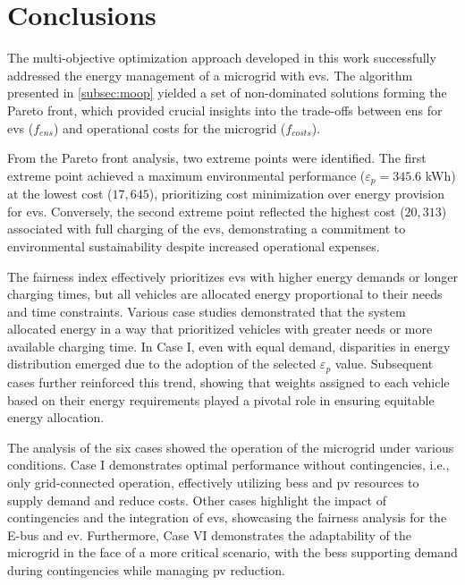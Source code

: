 \documentclass[preprint, 12pt, 3p]{elsarticle}
\begin{document}
\glsresetall

\section{Conclusions}\label{sec:conclusions}

The multi-objective optimization approach developed in this work successfully addressed the energy management of a microgrid with \glspl{ev}. The algorithm presented in \ref{subsec:moop} yielded a set of non-dominated solutions forming the Pareto front, which provided crucial insights into the trade-offs between \gls{ens} for \glspl{ev} ($f_{ens}$) and operational costs for the microgrid ($f_{costs}$). 

From the Pareto front analysis, two extreme points were identified. The first extreme point achieved a maximum environmental performance ($\varepsilon_{p} = 345.6$ kWh) at the lowest cost ($17,645$), prioritizing cost minimization over energy provision for \glspl{ev}. Conversely, the second extreme point reflected the highest cost ($20,313$) associated with full charging of the \glspl{ev}, demonstrating a commitment to environmental sustainability despite increased operational expenses.

The fairness index effectively prioritizes \glspl{ev} with higher energy demands or longer charging times, but all vehicles are allocated energy proportional to their needs and time constraints. Various case studies demonstrated that the system allocated energy in a way that prioritized vehicles with greater needs or more available charging time. In Case I, even with equal demand, disparities in energy distribution emerged due to the adoption of the selected $\varepsilon_{p}$ value. Subsequent cases further reinforced this trend, showing that weights assigned to each vehicle based on their energy requirements played a pivotal role in ensuring equitable energy allocation.

The analysis of the six cases showed the operation of the microgrid under various conditions. Case I demonstrates optimal performance without contingencies, i.e., only grid-connected operation, effectively utilizing \gls{bess} and \gls{pv} resources to supply demand and reduce costs. Other cases highlight the impact of contingencies and the integration of \glspl{ev}, showcasing the fairness analysis for the E-bus and \gls{ev}. Furthermore, Case VI demonstrates the adaptability of the microgrid in the face of a more critical scenario, with the \gls{bess} supporting demand during contingencies while managing \gls{pv} reduction. 
\end{document}
